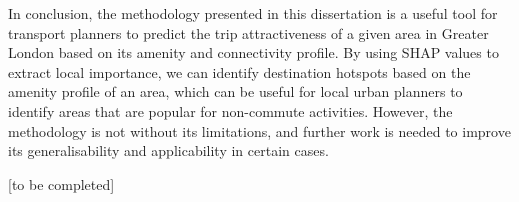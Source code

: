 In conclusion, the methodology presented in this dissertation is a useful tool for transport planners to predict the trip attractiveness of a given area in Greater London based on its amenity and connectivity profile. By using SHAP values to extract local importance, we can identify destination hotspots based on the amenity profile of an area, which can be useful for local urban planners to identify areas that are popular for non-commute activities. However, the methodology is not without its limitations, and further work is needed to improve its generalisability and applicability in certain cases.

[to be completed]